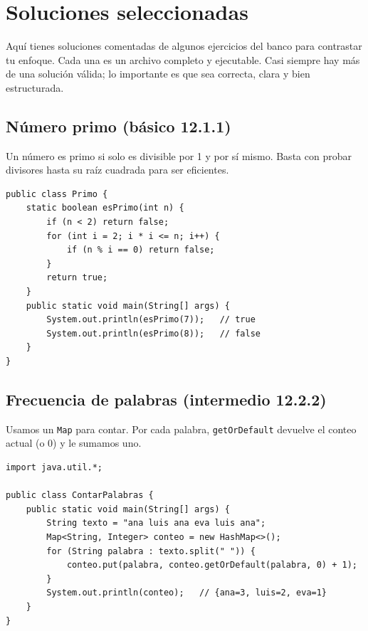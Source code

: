 \documentclass[11pt]{article}
\begin{document}
\section{Soluciones seleccionadas}
Aquí tienes soluciones comentadas de algunos ejercicios del banco para contrastar tu enfoque. Cada una es un archivo completo y ejecutable. Casi siempre hay más de una solución válida; lo importante es que sea correcta, clara y bien estructurada.

\subsection{Número primo (básico 12.1.1)}
Un número es primo si solo es divisible por 1 y por sí mismo. Basta con probar divisores hasta su raíz cuadrada para ser eficientes.

\begin{cajacodigo}
\begin{lstlisting}[style=java]
public class Primo {
    static boolean esPrimo(int n) {
        if (n < 2) return false;
        for (int i = 2; i * i <= n; i++) {
            if (n % i == 0) return false;
        }
        return true;
    }
    public static void main(String[] args) {
        System.out.println(esPrimo(7));   // true
        System.out.println(esPrimo(8));   // false
    }
}
\end{lstlisting}
\end{cajacodigo}
\vspace{2pt}
\subsection{Frecuencia de palabras (intermedio 12.2.2)}
Usamos un \texttt{Map} para contar. Por cada palabra, \texttt{get\allowbreak{}Or\allowbreak{}Default} devuelve el conteo actual (o 0) y le sumamos uno.

\begin{cajacodigo}
\begin{lstlisting}[style=java]
import java.util.*;

public class ContarPalabras {
    public static void main(String[] args) {
        String texto = "ana luis ana eva luis ana";
        Map<String, Integer> conteo = new HashMap<>();
        for (String palabra : texto.split(" ")) {
            conteo.put(palabra, conteo.getOrDefault(palabra, 0) + 1);
        }
        System.out.println(conteo);   // {ana=3, luis=2, eva=1}
    }
}
\end{lstlisting}
\end{cajacodigo}
\vspace{2pt}
\end{document}
